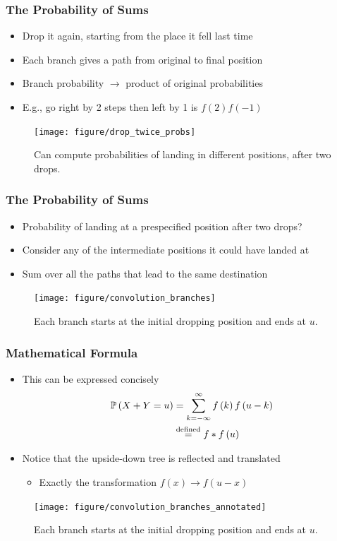 \documentclass[10pt,mathserif]{beamer}
\begin{document}
\begin{frame}
  \frametitle{The Probability of Sums}
  \begin{itemize}
    \item Drop it again, starting from the place it fell last time
    \item Each branch gives a path from original to final position
    \item Branch probability $\rightarrow$ product of original probabilities
    \item E.g., go right by 2 steps then left by 1 is $f\left(2\right)f\left(-1\right)$
  \end{itemize}
  \begin{figure}[ht]
    \centering
    \texttt{[image: figure/drop\_twice\_probs]}
    \caption{Can compute probabilities of landing in different positions, after
      two drops.
       \label{fig:drop_twice_probs}}
  \end{figure}
\end{frame}

\begin{frame}
  \frametitle{The Probability of Sums}
  \begin{itemize}
    \item Probability of landing at a prespecified position after
      two drops?
    \item Consider any of the intermediate positions it could have
      landed at
    \item Sum over all the paths that lead to the same destination
  \end{itemize}
  \begin{figure}[ht]
    \centering
    \texttt{[image: figure/convolution\_branches]}
    \caption{Each branch starts at the initial dropping position and ends at
      $u$. \label{fig:convolution_branches} }
  \end{figure}
\end{frame}

\begin{frame}
  \frametitle{Mathematical Formula}
  \begin{itemize}
    \item This can be expressed concisely
      \begin{align*}
        \mathbb{P}\left({X + Y = u}\right) &= \sum_{k = -\infty}^{\infty} f\left(k\right)f\left(u - k\right) \\
        &\stackrel{\text{defined}}{=} f * f \left(u\right)
      \end{align*}
    \item Notice that the upside-down tree is reflected and translated
      \begin{itemize}
      \item Exactly the transformation $f\left(x\right) \rightarrow f\left(u - x\right)$
      \end{itemize}
  \end{itemize}
  \begin{figure}[ht]
    \centering
    \texttt{[image: figure/convolution\_branches\_annotated]}
    \caption{Each branch starts at the initial dropping position and ends at
      $u$. \label{fig:convolution_branches} }
  \end{figure}
\end{frame}
\end{document}
